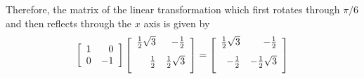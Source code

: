\begin{solution}
Therefore, the matrix of the linear transformation which first rotates
through $\pi /6$ and then reflects through the $x$ axis is given by 
\begin{equation*}
\leftB
\begin{array}{rr}
1 & 0 \\
0 & -1
\end{array}
\rightB \leftB
\begin{array}{rr}
\vspace{0.05in}\frac{1}{2}\sqrt{3} & -\vspace{0.05in}\frac{1}{2} \\
\vspace{0.05in}\frac{1}{2} & \vspace{0.05in}\frac{1}{2}\sqrt{3}
\end{array}
\rightB =\allowbreak \leftB
\begin{array}{rr}
\vspace{0.05in}\frac{1}{2}\sqrt{3} & -\vspace{0.05in}\frac{1}{2} \\
-\vspace{0.05in}\frac{1}{2} & -\vspace{0.05in}\frac{1}{2}\sqrt{3}
\end{array}
\rightB 
\end{equation*}
\end{solution}
